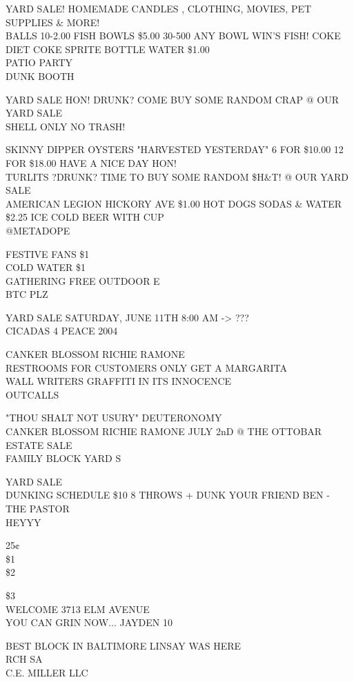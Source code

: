 \documentclass[10pt,letterpaper]{article}
\begin{document}
YARD SALE! HOMEMADE CANDLES , CLOTHING, MOVIES, PET SUPPLIES \& MORE!\\
BALLS 10{-}2.00 FISH BOWLS \$5.00 30{-}500 ANY BOWL WIN'S FISH!  COKE DIET COKE SPRITE BOTTLE WATER \$1.00\\
PATIO PARTY\\
DUNK BOOTH

YARD SALE HON!  DRUNK?  COME BUY SOME RANDOM CRAP @ OUR YARD SALE\\
SHELL ONLY NO TRASH!

SKINNY DIPPER OYSTERS "HARVESTED YESTERDAY" 6 FOR \$10.00 12 FOR \$18.00 HAVE A NICE DAY HON!\\
TURLITS ?DRUNK? TIME TO BUY SOME RANDOM \$H\&T! @ OUR YARD SALE\\
AMERICAN LEGION HICKORY AVE \$1.00 HOT DOGS SODAS \& WATER \$2.25 ICE COLD BEER WITH CUP\\
@METADOPE

FESTIVE FANS \$1\\
COLD WATER \$1\\
GATHERING FREE OUTDOOR E\\
BTC PLZ

YARD SALE SATURDAY, JUNE 11TH 8:00 AM {-}> ???\\
CICADAS 4 PEACE 2004

CANKER BLOSSOM RICHIE RAMONE\\
RESTROOMS FOR CUSTOMERS ONLY GET A MARGARITA\\
WALL WRITERS GRAFFITI IN ITS INNOCENCE\\
OUTCALLS

"THOU SHALT NOT USURY" DEUTERONOMY\\
CANKER BLOSSOM RICHIE RAMONE JULY 2nD @ THE OTTOBAR\\
ESTATE SALE\\
FAMILY BLOCK YARD S

YARD SALE\\
DUNKING SCHEDULE \$10 8 THROWS + DUNK YOUR FRIEND BEN {-} THE PASTOR\\
HEYYY

25¢\\
\$1\\
\$2

\$3\\
WELCOME 3713 ELM AVENUE\\
YOU CAN GRIN NOW... JAYDEN 10

BEST BLOCK IN BALTIMORE LINSAY WAS HERE\\
RCH SA\\
C.E. MILLER LLC
\end{document}
